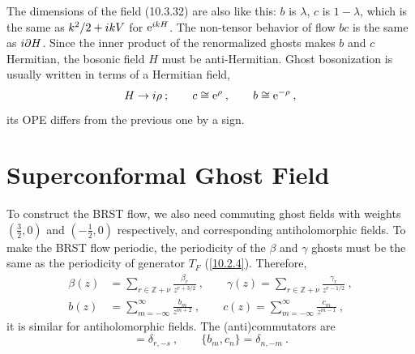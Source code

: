 	The dimensions of the field (10.3.32) are also like this: $b$ is $\lambda$, $c$ is $1-\lambda$, which is the same as $k^{2}/2+i kV$ for $\mathrm{e}^{i kH}$. The non-tensor behavior of flow $bc$ is the same as $i\partial H$. Since the inner product of the renormalized ghosts makes $b$ and $c$ Hermitian, the bosonic field $H$ must be anti-Hermitian. Ghost bosonization is usually written in terms of a Hermitian field,
	\begin{equation}
		H\to i\rho \: ; \qquad c \cong \mathrm{e}^{\rho} \:, \qquad b\cong \mathrm{e}^{-\rho} \:,\label{10.3.34}
	\end{equation}
	its OPE differs from the previous one by a sign.
	
	\section{Superconformal Ghost Field}
	
	To construct the BRST flow, we also need commuting ghost fields with weights $(\frac{3}{2},0)$ and $(-\frac{1}{2},0)$ respectively, and corresponding antiholomorphic fields. To make the BRST flow periodic, the periodicity of the $\beta$ and $\gamma$ ghosts must be the same as the periodicity of generator $T_{F}$ (\ref{10.2.4}). Therefore,
	\begin{subequations}
		\begin{align}
			\beta(z)&=\sum_{r\in \mathds{Z}+\nu}\frac{\beta_{r}}{z^{r+3/2}}\:, \qquad 
			\gamma(z)=\sum_{r\in \mathds{Z}+\nu}\frac{\gamma_{r}}{z^{r-1/2}}\:, \label{10.4.1a} \\
			b(z)&=\sum_{m=-\infty}^{\infty}\frac{b_{m}}{z^{m+2}} \:, \qquad 
			c(z)=\sum_{m=-\infty}^{\infty}\frac{c_{m}}{z^{m-1}} \:,  \label{10.4.1b}
		\end{align} \label{10.4.1}
	\end{subequations}
	it is similar for antiholomorphic fields. The (anti)commutators are
	\begin{equation}
		[\gamma_{r},\beta_{s}] =\delta_{r,-s} \:, \qquad \{b_{m},c_{n}\}=\delta_{n,-m} \:. \label{10.4.2}
	\end{equation}
	

